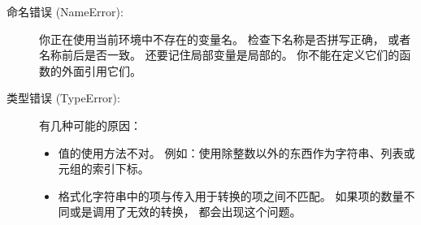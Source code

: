 \begin{description}


\item[命名错误 (NameError):]  你正在使用当前环境中不存在的变量名。
检查下名称是否拼写正确， 或者名称前后是否一致。
还要记住局部变量是局部的。  你不能在定义它们的函数的外面引用它们。


\item[类型错误 (TypeError):]  有几种可能的原因：


\begin{itemize}


\item 值的使用方法不对。  例如：使用除整数以外的东西作为字符串、列表或元组的索引下标。


\item 格式化字符串中的项与传入用于转换的项之间不匹配。
如果项的数量不同或是调用了无效的转换， 都会出现这个问题。



\end{itemize}
\end{description}
